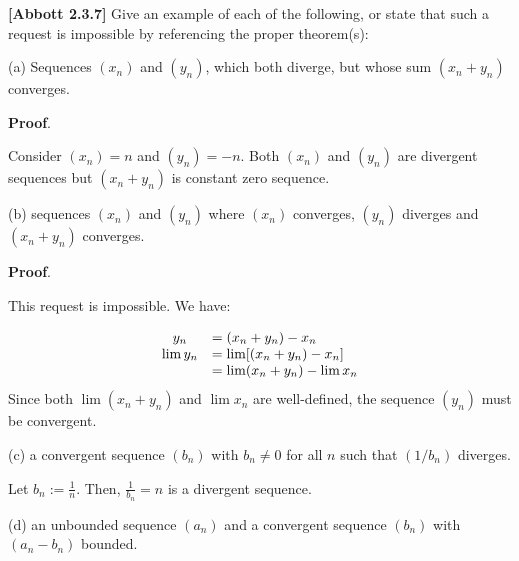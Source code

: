 \documentclass[10pt]{article}
\begin{document}
\textbf{[Abbott 2.3.7]} Give an example of each of the following, or state that such a request is impossible by referencing the proper theorem(s):



(a) Sequences $\displaystyle ( x_{n})$ and $\displaystyle ( y_{n})$, which both diverge, but whose sum $\displaystyle ( x_{n} +y_{n})$ converges.



\textbf{Proof}.



Consider $\displaystyle ( x_{n}) =n$ and $\displaystyle ( y_{n}) =-n$. Both $\displaystyle ( x_{n})$ and $\displaystyle ( y_{n})$ are divergent sequences but $\displaystyle ( x_{n} +y_{n})$ is constant zero sequence.



(b) sequences $\displaystyle ( x_{n})$ and $\displaystyle ( y_{n})$ where $\displaystyle ( x_{n})$ converges, $\displaystyle ( y_{n})$ diverges and $\displaystyle ( x_{n} +y_{n})$ converges. 



\textbf{Proof}.



This request is impossible. We have:




\begin{equation*}
\begin{array}{ c l }
y_{n} & =( x_{n} +y_{n}) -x_{n}\\
\lim y_{n} & =\lim [( x_{n} +y_{n}) -x_{n}]\\
 & =\lim ( x_{n} +y_{n}) -\lim x_{n}
\end{array}
\end{equation*}
Since both $\displaystyle \lim ( x_{n} +y_{n})$ and $\displaystyle \lim x_{n}$ are well-defined, the sequence $\displaystyle ( y_{n})$ must be convergent.



(c) a convergent sequence $\displaystyle ( b_{n})$ with $\displaystyle b_{n} \neq 0$ for all $\displaystyle n$ such that $\displaystyle ( 1/b_{n})$ diverges.



Let $\displaystyle b_{n} :=\frac{1}{n}$. Then, $\displaystyle \frac{1}{b_{n}} =n$ is a divergent sequence.



(d) an unbounded sequence $\displaystyle ( a_{n})$ and a convergent sequence $\displaystyle ( b_{n})$ with $\displaystyle ( a_{n} -b_{n})$ bounded.
\end{document}
